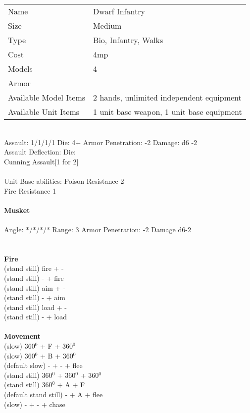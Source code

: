 \begin{tabular}{ll}
  Name & Dwarf Infantry \\
  Size & Medium\\
  Type & Bio, Infantry, Walks\\
  Cost & 4mp\\
  Models & 4\\
  Armor & \\
  Available Model Items & 2 hands, unlimited independent equipment \\
  Available Unit Items & 1 unit base weapon, 1 unit base equipment \\
\end{tabular}

\ \\
Assault: 1/1/1/1 Die: 4+ Armor Penetration: -2 Damage: d6 -2 \\
Assault Deflection:  Die: \\
\indent Cunning Assault[1 for 2] \\
\ \\
Unit Base abilities: Poison Resistance 2 \\ Fire Resistance 1
\ \\
\ \\
{\bf Musket } \\
\ \\
Angle: */*/*/* Range: 3 Armor Penetration: -2 Damage d6-2 \\
\indent  \\





\ \\ {\bf Fire } \\
(stand still) fire + - \\
(stand still) - + fire \\
(stand still) aim + - \\
(stand still) - + aim \\
(stand still) load + - \\
(stand still) - + load \\
\ \\ {\bf Movement } \\
(slow) 360$^0$ + F + 360$^0$ \\
(slow) 360$^0$ + B + 360$^0$ \\
(default slow) - + - + flee \\
(stand still) 360$^0$ + 360$^0$ + 360$^0$ \\
(stand still) 360$^0$ + A + F \\
(default stand still) - + A + flee \\
(slow) - + - + chase \\



